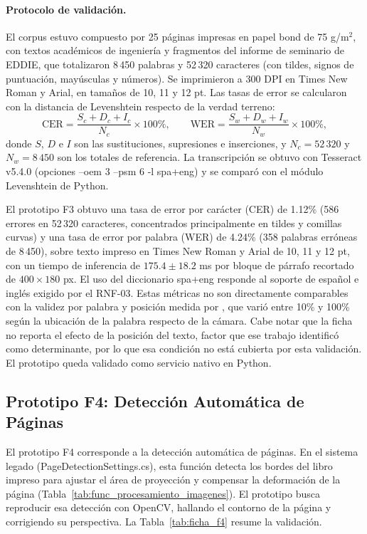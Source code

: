 \paragraph{Protocolo de validación.} El corpus estuvo compuesto por 25 páginas impresas en papel bond de 75 g/m$^2$, con textos académicos de ingeniería y fragmentos del informe de seminario de EDDIE, que totalizaron 8\,450 palabras y 52\,320 caracteres (con tildes, signos de puntuación, mayúsculas y números). Se imprimieron a 300 DPI en Times New Roman y Arial, en tamaños de 10, 11 y 12 pt. Las tasas de error se calcularon con la distancia de Levenshtein respecto de la verdad terreno:
\[ \mathrm{CER} = \frac{S_c + D_c + I_c}{N_c} \times 100\%, \qquad \mathrm{WER} = \frac{S_w + D_w + I_w}{N_w} \times 100\%, \]
donde $S$, $D$ e $I$ son las sustituciones, supresiones e inserciones, y $N_c = 52\,320$ y $N_w = 8\,450$ son los totales de referencia. La transcripción se obtuvo con Tesseract v5.4.0 (opciones --oem 3 --psm 6 -l spa+eng) y se comparó con el módulo Levenshtein de Python.
 
El prototipo F3 obtuvo una tasa de error por carácter (CER) de 1.12\% (586 errores en 52\,320 caracteres, concentrados principalmente en tildes y comillas curvas) y una tasa de error por palabra (WER) de 4.24\% (358 palabras erróneas de 8\,450), sobre texto impreso en Times New Roman y Arial de 10, 11 y 12 pt, con un tiempo de inferencia de $175.4 \pm 18.2$ ms por bloque de párrafo recortado de $400 \times 180$ px. El uso del diccionario spa+eng responde al soporte de español e inglés exigido por el RNF-03. Estas métricas no son directamente comparables con la validez por palabra y posición medida por \cite{ibaceta2023evaluacion}, que varió entre 10\% y 100\% según la ubicación de la palabra respecto de la cámara. Cabe notar que la ficha no reporta el efecto de la posición del texto, factor que ese trabajo identificó como determinante, por lo que esa condición no está cubierta por esta validación. El prototipo queda validado como servicio nativo en Python.
 
\subsection{Prototipo F4: Detección Automática de Páginas}
 
El prototipo F4 corresponde a la detección automática de páginas. En el sistema legado (PageDetectionSettings.cs), esta función detecta los bordes del libro impreso para ajustar el área de proyección y compensar la deformación de la página (Tabla~\ref{tab:func_procesamiento_imagenes}). El prototipo busca reproducir esa detección con OpenCV, hallando el contorno de la página y corrigiendo su perspectiva. La Tabla~\ref{tab:ficha_f4} resume la validación.
 
